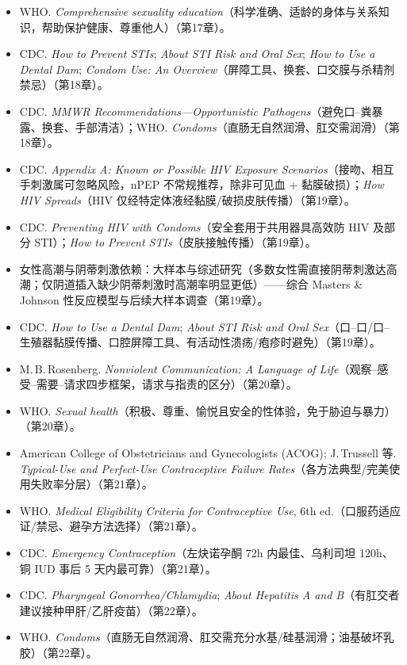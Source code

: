 \documentclass[12pt,UTF8,openany]{ctexbook}
\begin{document}
\begin{itemize}[leftmargin=2em]
  \item WHO. \emph{Comprehensive sexuality education}（科学准确、适龄的身体与关系知识，帮助保护健康、尊重他人）（第17章）。
  \item CDC. \emph{How to Prevent STIs}; \emph{About STI Risk and Oral Sex}; \emph{How to Use a Dental Dam}; \emph{Condom Use: An Overview}（屏障工具、换套、口交膜与杀精剂禁忌）（第18章）。
  \item CDC. \emph{MMWR Recommendations—Opportunistic Pathogens}（避免口--粪暴露、换套、手部清洁）；WHO. \emph{Condoms}（直肠无自然润滑、肛交需润滑）（第18章）。
  \item CDC. \emph{Appendix A: Known or Possible HIV Exposure Scenarios}（接吻、相互手刺激属可忽略风险，nPEP 不常规推荐，除非可见血 + 黏膜破损）；\emph{How HIV Spreads}（HIV 仅经特定体液经黏膜/破损皮肤传播）（第19章）。
  \item CDC. \emph{Preventing HIV with Condoms}（安全套用于共用器具高效防 HIV 及部分 STI）；\emph{How to Prevent STIs}（皮肤接触传播）（第19章）。
  \item 女性高潮与阴蒂刺激依赖：大样本与综述研究（多数女性需直接阴蒂刺激达高潮；仅阴道插入缺少阴蒂刺激时高潮率明显更低）——综合 Masters \& Johnson 性反应模型与后续大样本调查（第19章）。
  \item CDC. \emph{How to Use a Dental Dam}; \emph{About STI Risk and Oral Sex}（口--口/口--生殖器黏膜传播、口腔屏障工具、有活动性溃疡/疱疹时避免）（第19章）。
  \item M.\,B.\,Rosenberg. \emph{Nonviolent Communication: A Language of Life}（观察--感受--需要--请求四步框架，请求与指责的区分）（第20章）。
  \item WHO. \emph{Sexual health}（积极、尊重、愉悦且安全的性体验，免于胁迫与暴力）（第20章）。
  \item American College of Obstetricians and Gynecologists (ACOG); J.\,Trussell 等. \emph{Typical-Use and Perfect-Use Contraceptive Failure Rates}（各方法典型/完美使用失败率分层）（第21章）。
  \item WHO. \emph{Medical Eligibility Criteria for Contraceptive Use}, 6th ed.（口服药适应证/禁忌、避孕方法选择）（第21章）。
  \item CDC. \emph{Emergency Contraception}（左炔诺孕酮 72h 内最佳、乌利司坦 120h、铜 IUD 事后 5 天内最可靠）（第21章）。
  \item CDC. \emph{Pharyngeal Gonorrhea/Chlamydia}; \emph{About Hepatitis A and B}（有肛交者建议接种甲肝/乙肝疫苗）（第22章）。
  \item WHO. \emph{Condoms}（直肠无自然润滑、肛交需充分水基/硅基润滑；油基破坏乳胶）（第22章）。

\end{itemize}
\end{document}
